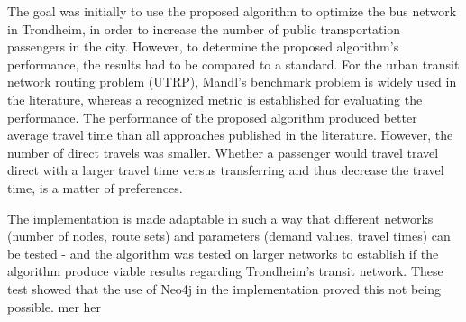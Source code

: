 

The goal was initially to use the proposed algorithm to optimize the bus network in Trondheim, in order to increase the number of public transportation passengers in the city. However, to determine the proposed algorithm's performance, the results had to be compared to a standard. For the urban transit network routing problem (UTRP), Mandl's benchmark problem is widely used in the literature, whereas a recognized metric is established for evaluating the performance. The performance of the proposed algorithm produced better average travel time than all approaches published in the literature. However, the number of direct travels was smaller. Whether a passenger would travel travel direct with a larger travel time versus transferring and thus decrease the travel time, is a matter of preferences.

The implementation is made adaptable in such a way that different networks (number of nodes, route sets) and parameters (demand values, travel times) can be tested - and the algorithm was tested on larger networks to establish if the algorithm produce viable results regarding Trondheim's transit network. These test showed that the use of Neo4j in the implementation proved this not being possible. mer her

